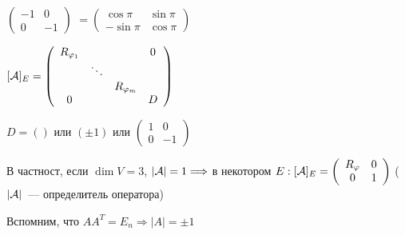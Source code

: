 $ \left(\begin{array}{cc}
-1 & 0 \\
0 & -1
\end{array}\right)$
$= \left(\begin{array}{cc}
    \cos{\pi} & \sin{\pi} \\
    -\sin{\pi} & \cos{\pi}
    \end{array}\right)$

$[\mathcal{A}]_{E} = \left(\begin{array}{cccc}
R_{\varphi_1} &  &  & 0 \\ 
 & \ddots &  &  \\ 
 &  & R_{\varphi_m} &  \\ 
0 &  &  & D
\end{array}\right)$

$D = ()$ или $(\pm 1)$ или $\left(\begin{array}{cc}
    1 & 0 \\ 
    0 & -1
    \end{array}\right)$

В частност, если $\dim V = 3$, $| \mathcal{A} | = 1 \Longrightarrow$ в некотором $E : [\mathcal{A}]_{E} = \left(\begin{array}{cc}
R_{\varphi} & 0 \\ 
0 & 1 
\end{array}\right)$ ($| \mathcal{A} |$~--- определитель оператора) %

Вспомним, что $AA^T = E_n \Longrightarrow |A| = \pm 1$

